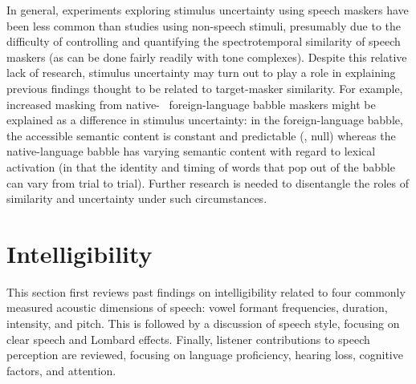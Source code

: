 In general, experiments exploring stimulus uncertainty using speech maskers have been less common than studies using non-speech stimuli, presumably due to the difficulty of controlling and quantifying the spectrotemporal similarity of speech maskers (as can be done fairly readily with tone complexes).  Despite this relative lack of research, stimulus uncertainty may turn out to play a role in explaining previous findings thought to be related to target-masker similarity.  For example, increased masking from native- \vs\ foreign-language babble maskers \citep[\eg][]{RhebergenEtAl2005, GarciaLecumberriCooke2006, VanEngenBradlow2007, BrouwerEtAl2012} might be explained as a difference in stimulus uncertainty: in the foreign-language babble, the accessible semantic content is constant and predictable (\ie, null) whereas the native-language babble has varying semantic content with regard to lexical activation (in that the identity and timing of words that pop out of the babble can vary from trial to trial).  Further research is needed to disentangle the roles of similarity and uncertainty under such circumstances.  %


\section{Intelligibility}
This section first reviews past findings on intelligibility related to four commonly measured acoustic dimensions of speech: vowel formant frequencies, duration, intensity, and pitch.  %
This is followed by a discussion of speech style, focusing on clear speech and Lombard effects.  Finally, listener contributions to speech perception are reviewed, focusing on language proficiency, hearing loss, cognitive factors, and attention.


